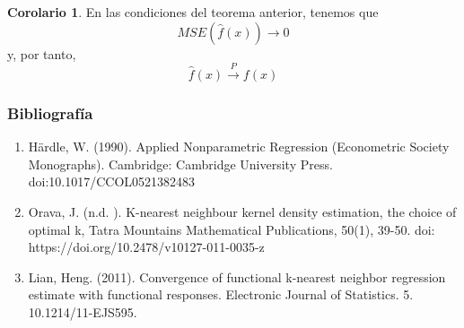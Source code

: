 \documentclass{beamer}
\theoremstyle{definition}
\newtheorem{coro}{Corolario}
\begin{document}
\begin{frame}
\begin{coro}
En las condiciones del teorema anterior, tenemos que
$$
MSE(\hat{f}(x))\to 0
$$
y, por tanto,
$$
\hat{f}(x)\overset{P}{\longrightarrow}f(x)
$$
\end{coro}
\end{frame}
\begin{frame}
\frametitle{Bibliografía}
\begin{enumerate}
\item Härdle, W. (1990). Applied Nonparametric Regression (Econometric Society Monographs). Cambridge: Cambridge University Press. doi:10.1017/CCOL0521382483
\item Orava, J. (n.d. ). K-nearest neighbour kernel density estimation, the choice of optimal k, Tatra Mountains Mathematical Publications, 50(1), 39-50. doi: https://doi.org/10.2478/v10127-011-0035-z
\item Lian, Heng. (2011). Convergence of functional k-nearest neighbor regression estimate with functional responses. Electronic Journal of Statistics. 5. 10.1214/11-EJS595. 
\end{enumerate}

\end{frame}
\end{document}
